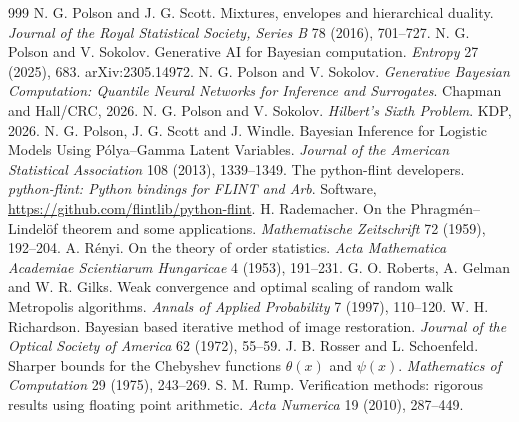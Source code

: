 \begin{thebibliography}{999}
 N. G. Polson and J. G. Scott. Mixtures, envelopes and hierarchical duality. \emph{Journal of the Royal Statistical Society, Series B} 78 (2016), 701--727.
 N. G. Polson and V. Sokolov. Generative AI for Bayesian computation. \emph{Entropy} 27 (2025), 683. arXiv:2305.14972.
 N. G. Polson and V. Sokolov. \emph{Generative Bayesian Computation: Quantile Neural Networks for Inference and Surrogates}. Chapman and Hall/CRC, 2026.
 N. G. Polson and V. Sokolov. \emph{Hilbert's Sixth Problem}. KDP, 2026.
 N. G. Polson, J. G. Scott and J. Windle. Bayesian Inference for Logistic Models Using P\'olya--Gamma Latent Variables. \emph{Journal of the American Statistical Association} 108 (2013), 1339--1349.
 The python-flint developers. \emph{python-flint: Python bindings for FLINT and Arb}. Software, \url{https://github.com/flintlib/python-flint}.
 H. Rademacher. On the Phragm\'en--Lindel\"of theorem and some applications. \emph{Mathematische Zeitschrift} 72 (1959), 192--204.
 A. R\'enyi. On the theory of order statistics. \emph{Acta Mathematica Academiae Scientiarum Hungaricae} 4 (1953), 191--231.
 G. O. Roberts, A. Gelman and W. R. Gilks. Weak convergence and optimal scaling of random walk Metropolis algorithms. \emph{Annals of Applied Probability} 7 (1997), 110--120.
 W. H. Richardson. Bayesian based iterative method of image restoration. \emph{Journal of the Optical Society of America} 62 (1972), 55--59.
 J. B. Rosser and L. Schoenfeld. Sharper bounds for the Chebyshev functions $\theta(x)$ and $\psi(x)$. \emph{Mathematics of Computation} 29 (1975), 243--269.
 S. M. Rump. Verification methods: rigorous results using floating point arithmetic. \emph{Acta Numerica} 19 (2010), 287--449.

\end{thebibliography}
